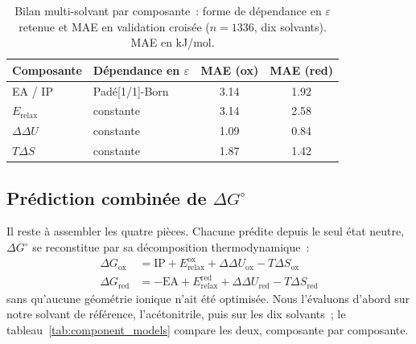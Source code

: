 \begin{table}[H]
\centering
\caption{Bilan multi-solvant par composante~: forme de dépendance en $\varepsilon$ retenue et MAE en validation croisée ($n = 1336$, dix solvants). MAE en kJ/mol.}
\label{tab:ms_bilan}
\footnotesize
\begin{tabular}{llcc}
\toprule
\textbf{Composante} & \textbf{Dépendance en $\varepsilon$} & \textbf{MAE (ox)} & \textbf{MAE (red)} \\
\midrule
EA / IP            & Padé[1/1]-Born          & 3.14 & 1.92 \\
$E_{\text{relax}}$ & constante               & 3.14 & 2.58 \\
$\Delta\Delta U$   & constante               & 1.09 & 0.84 \\
$T\Delta S$        & constante               & 1.87 & 1.42 \\
\bottomrule
\end{tabular}
\end{table}

\subsection{Prédiction combinée de $\Delta G^\circ$}
\label{sec:dG_combined}

Il reste à assembler les quatre pièces. Chacune prédite depuis le seul état neutre, $\Delta G^\circ$ se reconstitue par sa décomposition thermodynamique~:
\begin{align}
\Delta G_{\text{ox}} &= \text{IP} + E_{\text{relax}}^{\text{ox}} + \Delta\Delta U_{\text{ox}} - T\Delta S_{\text{ox}} \label{eq:dG_ox_decomp} \\
\Delta G_{\text{red}} &= -\text{EA} + E_{\text{relax}}^{\text{red}} + \Delta\Delta U_{\text{red}} - T\Delta S_{\text{red}} \label{eq:dG_red_decomp}
\end{align}
sans qu'aucune géométrie ionique n'ait été optimisée. Nous l'évaluons d'abord sur notre solvant de référence, l'acétonitrile, puis sur les dix solvants~; le tableau~\ref{tab:component_models} compare les deux, composante par composante.

